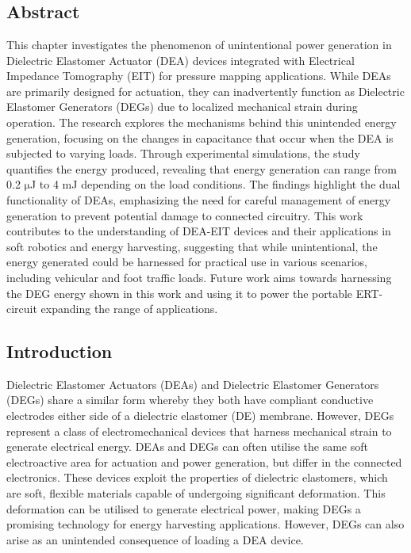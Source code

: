 \chapter{\chapviiname}
\label{chapter7}



\section*{Abstract}
	This chapter investigates the phenomenon of unintentional power generation in Dielectric Elastomer Actuator (DEA) devices integrated with Electrical Impedance Tomography (EIT) for pressure mapping applications. While DEAs are primarily designed for actuation, they can inadvertently function as Dielectric Elastomer Generators (DEGs) due to localized mechanical strain during operation. The research explores the mechanisms behind this unintended energy generation, focusing on the changes in capacitance that occur when the DEA is subjected to varying loads. Through experimental simulations, the study quantifies the energy produced, revealing that energy generation can range from 0.2 $\mathrm{\mu}$J to 4 mJ depending on the load conditions. The findings highlight the dual functionality of DEAs, emphasizing the need for careful management of energy generation to prevent potential damage to connected circuitry. This work contributes to the understanding of DEA-EIT devices and their applications in soft robotics and energy harvesting, suggesting that while unintentional, the energy generated could be harnessed for practical use in various scenarios, including vehicular and foot traffic loads. Future work aims towards harnessing the DEG energy shown in this work and using it to power the portable ERT-circuit expanding the range of applications.



\section{Introduction} %
\label{sec:introduction}
Dielectric Elastomer Actuators (DEAs) and Dielectric Elastomer Generators (DEGs) share a similar form whereby they both have compliant conductive electrodes either side of a dielectric elastomer (DE) membrane. However, DEGs represent a class of electromechanical devices that harness mechanical strain to generate electrical energy. DEAs and DEGs can often utilise the same soft electroactive area for actuation and power generation, but differ in the connected electronics. These devices exploit the properties of dielectric elastomers, which are soft, flexible materials capable of undergoing significant deformation. This deformation can be utilised to generate electrical power, making DEGs a promising technology for energy harvesting applications. However, DEGs can also arise as an unintended consequence of loading a DEA device.

